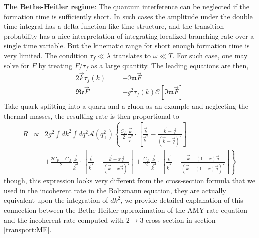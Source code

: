 {\bf The Bethe-Heitler regime}: The quantum interference can be neglected if the formation time is sufficiently short.
In such cases the amplitude under the double time integral has a delta-function like time structure, and the transition probability has a nice interpretation of integrating localized branching rate over a single time variable.
But the kinematic range for short enough formation time is very limited. 
The condition $\tau_f \ll \lambda$ translates to $\omega \ll T$.
For such case, one may solve for $F$ by treating $F/\tau_f$ as a large quantity.
The leading equations are then,
\begin{eqnarray}
2\vec{k}\tau_f(k) &=& - \mathfrak{Im} \vec{F} \\
\mathfrak{Re} \vec{F} &=& -g^2 \tau_f(k)\mathcal{C}[\mathfrak{Im} \vec{F}] 
\end{eqnarray}
Take quark splitting into a quark and a gluon as an example and neglecting the thermal masses, the resulting rate is then proportional to 
\begin{eqnarray}
R &\propto& 2g^2 \int d k^2 \int d q^2 \mathcal{A}(q_\perp^2) \left\{
\frac{C_A}{2} \frac{\vec{k}}{\vec{k}^2}\cdot\left[\frac{\vec{k}}{\vec{k}^2}-\frac{\vec{k}-\vec{q}}{(\vec{k}-\vec{q})^2}\right] \right.\\\nonumber
&&+\left. \frac{2C_F-C_A}{2} \frac{\vec{k}}{\vec{k}^2}\cdot\left[\frac{\vec{k}}{\vec{k}^2}-\frac{\vec{k}+x\vec{q}}{(\vec{k}+x\vec{q})^2}\right]
+\frac{C_A}{2} \frac{\vec{k}}{\vec{k}^2}\cdot\left[\frac{\vec{k}}{\vec{k}^2}-\frac{\vec{k}+(1-x)\vec{q}}{(\vec{k}+(1-x)\vec{q})^2}\right]
\right\}
\end{eqnarray}
though, this expression looks very different from the cross-section formula that we used in the incoherent rate in the Boltzmann equation, they are actually equivalent upon the integration of $dk^2$, we provide detailed explanation of this connection between the Bethe-Heitler approximation of the AMY rate equation and the incoherent rate computed with $2\rightarrow 3$ cross-section in section \ref{transport:ME}.


